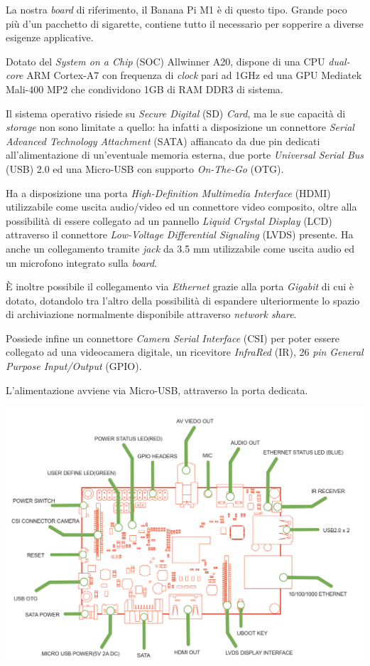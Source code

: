 La nostra \emph{board} di riferimento, il Banana Pi M1 è di questo tipo. Grande 
poco più d'un pacchetto di sigarette, contiene tutto il necessario per 
sopperire a diverse esigenze applicative.

Dotato del \emph{System on a Chip} (SOC) Allwinner A20, dispone di una 
CPU \emph{dual-core} ARM Cortex-A7 con frequenza di 
\textit{clock} pari ad 1GHz ed una GPU
Mediatek Mali-400 MP2 che condividono 1GB di RAM DDR3 di sistema.

Il sistema operativo risiede su \textit{Secure Digital} (SD) \textit{Card}, ma 
le sue capacità di \emph{storage} non sono limitate a quello: ha infatti a 
disposizione un connettore \textit{Serial Advanced Technology Attachment} 
(SATA) affiancato da due pin dedicati all'alimentazione di un'eventuale 
memoria esterna, due porte \textit{Universal Serial Bus} (USB) 2.0 ed una 
Micro-USB con supporto \textit{On-The-Go} (OTG).

Ha a disposizione una porta \textit{High-Definition Multimedia Interface} 
(HDMI) utilizzabile come uscita audio/video ed un connettore video composito, 
oltre alla possibilità di essere collegato ad un pannello \textit{Liquid 
Crystal Display} (LCD) attraverso il connettore \textit{Low-Voltage 
Differential Signaling} (LVDS) presente. Ha anche un collegamento tramite 
\emph{jack} da 3.5 mm utilizzabile come uscita audio ed un microfono integrato 
sulla \emph{board}.

\`E inoltre possibile il collegamento via \textit{Ethernet} grazie alla porta 
\textit{Gigabit} di cui è dotato, dotandolo tra l'altro della possibilità di 
espandere ulteriormente lo spazio di archiviazione normalmente disponibile 
attraverso \emph{network share}.

Possiede infine un connettore \textit{Camera Serial Interface} (CSI) per poter 
essere collegato ad una videocamera digitale, un ricevitore \textit{InfraRed} 
(IR), 26 \textit{pin} \textit{General Purpose Input/Output} (GPIO).

L'alimentazione avviene via Micro-USB, attraverso la porta dedicata.

\includegraphics[width=1\textwidth]{Figures/bananapi_schema.png}